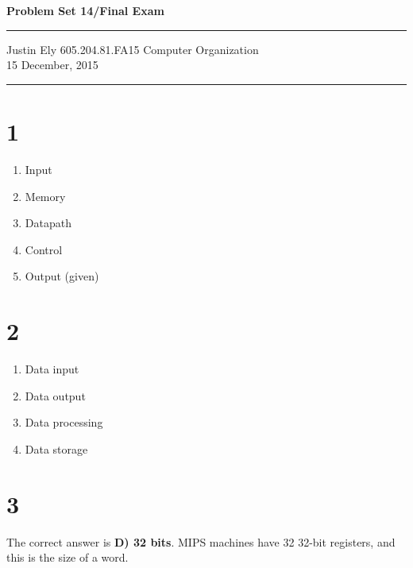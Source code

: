 \documentclass[a4paper,11pt]{article}
\begin{document}
\begin{flushright}

\vspace{1.1cm}

{\bf\Huge Problem Set 14/Final Exam}

\rule{0.25\linewidth}{0.5pt}

\vspace{0.5cm}
Justin Ely
\linebreak
\newline
\footnotesize{605.204.81.FA15 Computer Organization\\}
\vspace{0.5cm}
15 December, 2015
\end{flushright}

\noindent\rule{\linewidth}{1.0pt}



\section*{1}

\begin{enumerate}
    \item Input
    \item Memory
    \item Datapath
    \item Control
    \item Output (given)
\end{enumerate}


\section*{2}
\begin{enumerate}
    \item Data input
    \item Data output
    \item Data processing
    \item Data storage
\end{enumerate}



\section*{3}
The correct answer is {\bf D) 32 bits}.  MIPS machines have 32 32-bit registers, and this is the size of a word.
\end{document}
